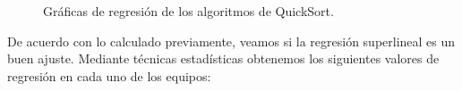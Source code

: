\documentclass{homework}
\begin{document}
    \begin{figure}
        \centering


        \caption{Gráficas de regresión de los algoritmos de QuickSort.}

        \label{hib:quicksort}
    \end{figure}

    De acuerdo con lo calculado previamente, veamos si la regresión superlineal es un buen ajuste. Mediante técnicas estadísticas
    obtenemos los siguientes valores de regresión en cada uno de los equipos:
\end{document}
